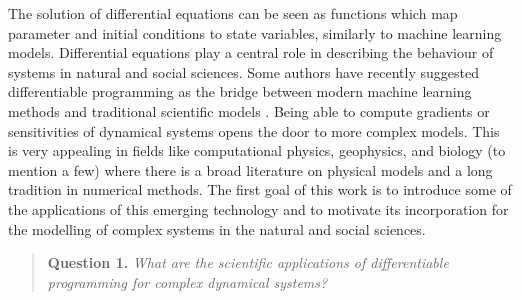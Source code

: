 The solution of differential equations can be seen as functions which map parameter and initial conditions to state variables, similarly to machine learning models.
Differential equations play a central role in describing the behaviour of systems in natural and social sciences. 
Some authors have recently suggested differentiable programming as the bridge between modern machine learning methods and traditional scientific models \cite{Ramsundar_Krishnamurthy_Viswanathan_2021, Shen_diff_modelling, Gelbrecht-differential-programming-Earth}. 
Being able to compute gradients or sensitivities of dynamical systems opens the door to more complex models.
This is very appealing in fields like computational physics, geophysics, and biology (to mention a few) where there is a broad literature on physical models and a long tradition in numerical methods. 
The first goal of this work is to introduce some of the applications of this emerging technology and to motivate its incorporation for the modelling of complex systems in the natural and social sciences. 
\begin{quote}
    \textbf{Question 1. }
    \textit{What are the scientific applications of differentiable programming for complex dynamical systems?}
\end{quote}

